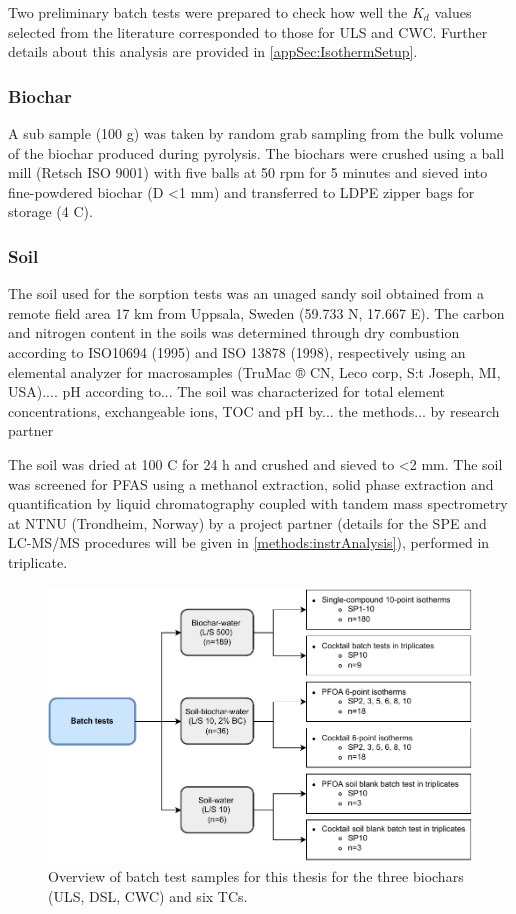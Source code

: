 Two preliminary batch tests were prepared to check how well the $K_d$ values selected from the literature corresponded to those for ULS and CWC. Further details about this analysis are provided in \cref{appSec:IsothermSetup}.

\subsubsection{Biochar}
A sub sample (100 g) was taken by random grab sampling from the bulk volume of the biochar produced during pyrolysis. The biochars were crushed using a ball mill (Retsch ISO 9001) with five balls at 50 rpm for 5 minutes and sieved into fine-powdered biochar (D \textless 1 mm) and transferred to LDPE zipper bags for storage (4 \textdegree C). 

\subsubsection{Soil}
The soil used for the sorption tests was an unaged sandy soil obtained from a remote field area 17 km from Uppsala, Sweden (59.733 N, 17.667 E). The carbon and nitrogen content in the soils was determined through dry combustion according to ISO10694 (1995) and ISO 13878 (1998), respectively using an elemental analyzer for macrosamples (TruMac ® CN, Leco corp, S:t Joseph, MI, USA).... pH according to...  The soil was characterized for total element concentrations, exchangeable ions, TOC and pH by... the methods... by research partner

The soil was dried at 100 \textdegree C for 24 h and crushed and sieved to \textless 2 mm.  The soil was screened for PFAS using a methanol extraction, solid phase extraction and quantification by liquid chromatography coupled with tandem mass spectrometry at NTNU (Trondheim, Norway) by a project partner (details for the SPE and LC-MS/MS procedures will be given in \cref{methods:instrAnalysis}), performed in triplicate.

\begin{figure}
    \centering
    \includegraphics{Diagrams/Methods-Page-9.pdf}
    \caption{Overview of batch test samples for this thesis for the three biochars (ULS, DSL, CWC) and six TCs.}
    \label{fig:batchtests_flowchart}
\end{figure}

